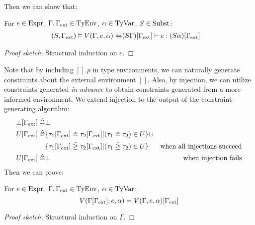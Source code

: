 \documentclass{article}
\begin{document}
Then we can show that:
\begin{clm}[Correnctness of $V$]
  For $e\in\text{Expr}$, $\Gamma,\Gamma_{\text{ext}}\in\text{TyEnv}$, $\alpha\in\text{TyVar}$, $S\in\text{Subst}$:
  \begin{align*}
    (S,\Gamma_{\text{ext}})\vDash V(\Gamma,e,\alpha) \Leftrightarrow & (S\Gamma)[\Gamma_{\text{ext}}]\vdash e:(S\alpha)[\Gamma_{\text{ext}}]
  \end{align*}
\end{clm}
\begin{proof}[Proof sketch]
  Structural induction on $e$.
\end{proof}

Note that by including $[].p$ in type environments, we can naturally generate constraints about the external environment $[]$.
Also, by injection, we can utilize constraints generated \emph{in advance} to obtain constraints generated from a more informed environment.
We extend injection to the output of the constraint-generating algorithm:
\begin{align*}
  \bot[\Gamma_{\text{ext}}] \triangleq & \bot                                                                                                          \\
  U[\Gamma_{\text{ext}}]    \triangleq & \{\tau_1[\Gamma_{\text{ext}}]\overset{\,_{\mbox{\Large .}}}{=}\tau_2[\Gamma_{\text{ext}}]|(\tau_1\overset{\,_{\mbox{\Large .}}}{=}\tau_2)\in U\}\cup                                      \\
                             & \{\tau_1[\Gamma_{\text{ext}}]\overset{\,_{\mbox{\Large .}}}{\ge}\tau_2[\Gamma_{\text{ext}}]|(\tau_1\overset{\,_{\mbox{\Large .}}}{\ge}\tau_2)\in U\} & \text{when all injections succeed} \\
  U[\Gamma_{\text{ext}}]    \triangleq & \bot                                                                     & \text{when injection fails}
\end{align*}
Then we can prove:
\begin{clm}[Advance]
  For $e\in\text{Expr}$, $\Gamma,\Gamma_{\text{ext}}\in\text{TyEnv}$, $\alpha\in\text{TyVar}$:
  \[V(\Gamma[\Gamma_{\text{ext}}],e,\alpha)=V(\Gamma,e,\alpha)[\Gamma_{\text{ext}}]\]
\end{clm}
\begin{proof}[Proof sketch]
  Structural induction on $\Gamma$.
\end{proof}
\end{document}
